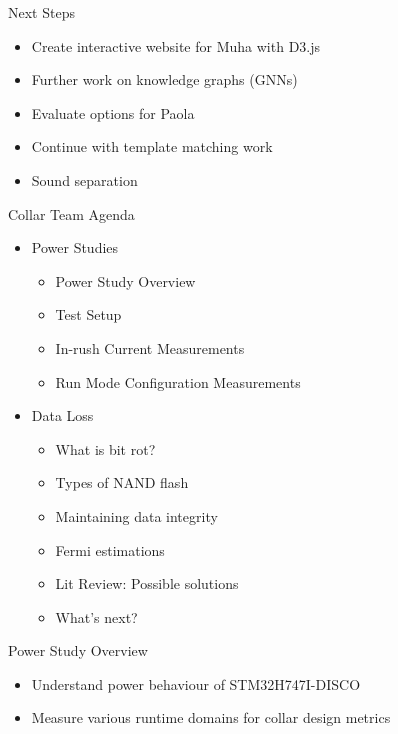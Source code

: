 \begin{frame}{Next Steps}
    \begin{itemize}
        \item Create interactive website for Muha with D3.js
        \item Further work on knowledge graphs (GNNs)
        \item Evaluate options for Paola
        \item Continue with template matching work
        \item Sound separation
    \end{itemize}
\end{frame}

\begin{frame}{Collar Team Agenda}
    \begin{itemize}
        \item Power Studies
        \begin{itemize}
            \item Power Study Overview
            \item Test Setup 
            \item In-rush Current Measurements
            \item Run Mode Configuration Measurements
        \end{itemize}
        \item Data Loss
        \begin{itemize}
            \item What is bit rot?
            \item Types of NAND flash
            \item Maintaining data integrity
            \item Fermi estimations
            \item Lit Review: Possible solutions
            \item What's next?
        \end{itemize}
    \end{itemize}
\end{frame}

\begin{frame}{Power Study Overview}
    \begin{itemize}
        \item Understand power behaviour of STM32H747I-DISCO
        \item Measure various runtime domains for collar design metrics
    \end{itemize}
\end{frame}

